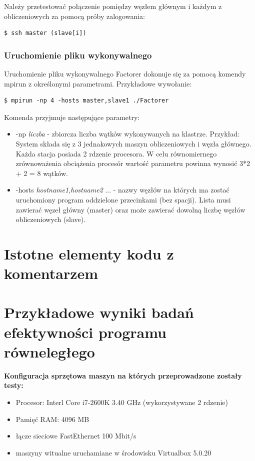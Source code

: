\documentclass{article}
\begin{document}
Należy przetestować połączenie pomiędzy węzłem głównym i każdym z obliczeniowych za pomocą próby zalogowania:
\begin{lstlisting}
$ ssh master (slave[i])
\end{lstlisting}

\subsubsection{Uruchomienie pliku wykonywalnego}
Uruchomienie pliku wykonywalnego Factorer dokonuje się za pomocą komendy mpirun z określonymi parametrami. Przykładowe wywołanie:
\begin{lstlisting}
$ mpirun -np 4 -hosts master,slave1 ./Factorer
\end{lstlisting}

Komenda przyjmuje następujące parametry:
\begin{itemize}
\item -np \textit{liczba} - zbiorcza liczba wątków wykonywanych na klastrze. Przykład:
System składa się z 3 jednakowych maszyn obliczeniowych i węzła głównego. Każda stacja posiada 2 rdzenie procesora. W celu równomiernego zrównoważenia obciążenia procesór wartość parametru powinna wynosić 3*2 + 2 = 8 wątków.

\item -hosts \textit{hostname1},\textit{hostname2} ... - nazwy węzłów na których ma zostać uruchomiony program oddzielone przecinkami (bez spacji). Lista musi zawierać węzeł główny (master) oraz może zawierać dowolną liczbę węzłów obliczeniowych (slave).
\end{itemize}

\section{Istotne elementy kodu z komentarzem}

\section{Przykładowe wyniki badań efektywności programu równeległego}

\textbf{Konfiguracja sprzętowa maszyn na których przeprowadzone zostały testy:}
\begin{itemize}
\item Procesor: Interl Core i7-2600K 3.40 GHz (wykorzystywane 2 rdzenie)
\item Pamięć RAM: 4096 MB
\item łącze sieciowe FastEthernet 100 Mbit/s
\item maszyny witualne uruchamiane w środowisku Virtualbox 5.0.20
\end{itemize}
\end{document}
